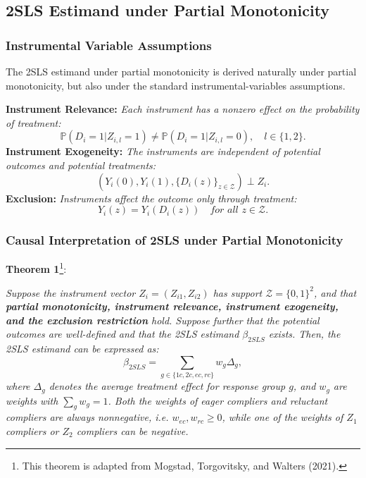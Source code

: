 \documentclass[
  12pt,
  a4paper,
  oneside]{article}
\begin{document}
\subsection{2SLS Estimand under Partial
Monotonicity}\label{sls-estimand-under-partial-monotonicity}

\subsubsection{Instrumental Variable
Assumptions}\label{instrumental-variable-assumptions}

The 2SLS estimand under partial monotonicity is derived naturally under
partial monotonicity, but also under the standard instrumental-variables
assumptions.

\textbf{Instrument Relevance:}
\textit{Each instrument has a nonzero effect on the probability of treatment:}
\begin{equation}
\mathbb{P}(D_i = 1 | Z_{i,l} = 1) \ne \mathbb{P}(D_i = 1 | Z_{i,l} = 0), \quad l \in \{1,2\}.
\end{equation} \textbf{Instrument Exogeneity:}
\textit{The instruments are independent of potential outcomes and potential treatments:}
\begin{equation}
(Y_i(0), Y_i(1), \{D_i(z)\}_{z \in \mathcal{Z}}) \perp Z_i.
\end{equation} \textbf{Exclusion:}
\textit{Instruments affect the outcome only through treatment:}
\begin{equation}
Y_i(z) = Y_i(D_i(z)) \quad \textit{for all } z \in \mathcal{Z}.
\end{equation}

\subsubsection{Causal Interpretation of 2SLS under Partial
Monotonicity}\label{causal-interpretation-of-2sls-under-partial-monotonicity}

\textbf{Theorem 1}\footnote{This theorem is adapted from Mogstad,
  Torgovitsky, and Walters (2021).}:

\textit{Suppose the instrument vector $Z_i = (Z_{i1}, Z_{i2})$ has support $\mathcal{Z} = \{0,1\}^2$, and that \textbf{partial monotonicity, instrument relevance, instrument exogeneity, and the exclusion restriction} hold. Suppose further that the potential outcomes are well-defined and that the 2SLS estimand $\beta_{2SLS}$ exists. Then, the 2SLS estimand can be expressed as:}
\begin{equation}
\beta_{2SLS} = \sum_{g \in \{1c, 2c, ec, rc\}} w_g \Delta_g,
\end{equation}
\textit{where $\Delta_g$ denotes the average treatment effect for response group $g$, and $w_g$ are weights with $\sum_g w_g = 1$. Both the weights of eager compliers and reluctant compliers are always nonnegative, i.e. $w_{ec}, w_{rc} \ge 0$, while one of the weights of $Z_1$ compliers or $Z_2$ compliers can be negative.}
\end{document}
